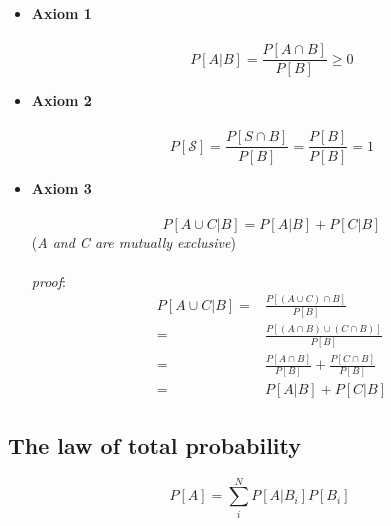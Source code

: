 \begin{itemize}
	\item \textbf{Axiom 1}\\\\ 
		\begin{equation*}
			P[A|B]=\frac{P[A\cap B]}{P[B]}\geq 0
		\end{equation*} 
	\item \textbf{Axiom 2}\\\\
		\begin{equation*}
			P[\mathcal{S}]=\frac{P[S\cap B]}{P[B]}=\frac{P[B]}{P[B]}=1
		\end{equation*} 
	\item \textbf{Axiom 3}\\\\
		\begin{equation*} 
			P[A\cup C|B]=P[A|B]+P[C|B]
		\end{equation*} 
		(\emph{A and C are mutually exclusive})\\\\
		\emph{proof}:
		\begin{equation*}
  			\begin{split}
    				P[A\cup C|B]
    			=&
    			\frac{P[(A\cup C)\cap B]}{P[B]}\\
    			=&
			\frac{P[(A\cap B)\cup(C\cap B)]}{P[B]}\\
			=&
			\frac{P[A\cap B]}{P[B]}+\frac{P[C\cap B]}{P[B]}\\
			=&
   			P[A|B]+P[C|B]
  			\end{split}
		\end{equation*}
\end{itemize}

\subsection{The law of total probability}
\begin{equation*}
	P[A]=\sum^{N}_{i}P[A|B_{i}]P[B_{i}]
\end{equation*}

